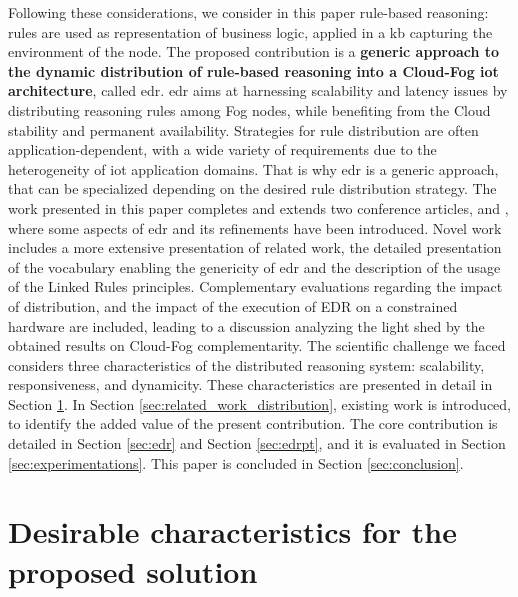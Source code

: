 \documentclass[sw]{iosart2x}
\newcommand{\edr}{EDR\xspace}
\begin{document}
Following these considerations, we consider in this paper rule-based reasoning: rules are used as representation of business logic, applied in a \gls{kb} capturing the environment of the node.
The proposed contribution is a \textbf{generic approach to the dynamic distribution of rule-based reasoning into a Cloud-Fog \gls{iot} architecture}, called \gls{edr}.
\gls{edr} aims at harnessing scalability and latency issues by distributing reasoning rules among Fog nodes, while benefiting from the Cloud stability and permanent availability. 
Strategies for rule distribution are often application-dependent, with a wide variety of requirements due to the heterogeneity of \gls{iot} application domains.
That is why \gls{edr} is a generic approach, that can be specialized depending on the desired rule distribution strategy.
The work presented in this paper completes and extends two conference articles, \cite{Seydoux2018_wi} and \cite{Seydoux2018_coopis}, where some aspects of \gls{edr} and its refinements have been introduced.
Novel work includes a more extensive presentation of related work, the detailed presentation of the vocabulary enabling the genericity of \gls{edr} and the description of the usage of the Linked Rules \cite{Khandelwal2011} principles. 
Complementary evaluations regarding the impact of distribution, and the impact of the execution of \edr on a constrained hardware are included, leading to a discussion analyzing the light shed by the obtained results on Cloud-Fog complementarity. 
The scientific challenge we faced considers three characteristics of the distributed reasoning system: scalability, responsiveness, and dynamicity. 
These characteristics are presented in detail in Section \textsection \ref{sec:edr_characteristics}.
In Section \textsection \ref{sec:related_work_distribution}, existing work is introduced, to identify the added value of the present contribution.
The core contribution is detailed in Section \textsection \ref{sec:edr} and Section \textsection \ref{sec:edrpt}, and it is evaluated in Section \textsection \ref{sec:experimentations}.
This paper is concluded in Section \textsection \ref{sec:conclusion}.

\section{Desirable characteristics for the proposed solution}
\label{sec:edr_characteristics}
\end{document}
